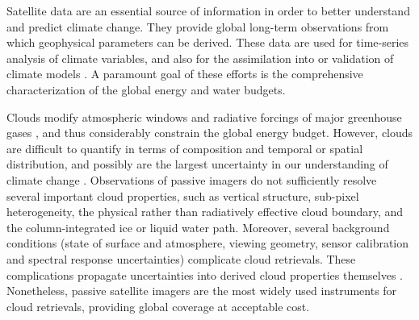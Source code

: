 \introduction

Satellite data are an essential source of information in order to better understand and predict climate change. They provide global long-term observations from which geophysical parameters can be derived. These data are used for time-series analysis of climate variables, and also for the assimilation into or validation of climate models \citep{Comiso14,Yang13}. A paramount goal of these efforts is the comprehensive characterization of the global energy and water budgets.

Clouds modify atmospheric windows and radiative forcings of major greenhouse gases \citep{Kiehl97}, and thus considerably constrain the global energy budget. However, clouds are difficult to quantify in terms of composition and temporal or spatial distribution, and possibly are the largest uncertainty in our understanding of climate change \citep{Norris16}. Observations of passive imagers do not sufficiently resolve several important cloud properties, such as vertical structure, sub-pixel heterogeneity, the physical rather than radiatively effective cloud boundary, and the column-integrated ice or liquid water path. Moreover, several background conditions (state of surface and atmosphere, viewing geometry, sensor calibration and spectral response uncertainties) complicate cloud retrievals. These complications propagate uncertainties into derived cloud properties themselves \citep{Hamann14}. Nonetheless, passive satellite imagers are the most widely used instruments for cloud retrievals, providing global coverage at acceptable cost. 

